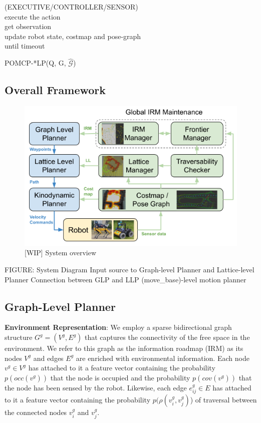 \documentclass{article}
\newcommand{\ph}[1]{{\textbf{#1}:}} %
\begin{document}
    (EXECUTIVE/CONTROLLER/SENSOR)\\
    execute the action\\
    get observation\\
    update robot state, costmap and pose-graph\\
until timeout


POMCP-*LP(Q, G, $\hat{\mathcal{G}}$)
\fi %







\subsection{Overall Framework} 



\begin{figure}[t!]
  \centering
  \includegraphics[width=.6\textwidth]{figures/SystemOverview.png}
  \caption{[WIP] System overview}
  \label{fig:system_overview}
\end{figure}

FIGURE: System Diagram
Input source to Graph-level Planner and Lattice-level Planner 
Connection between GLP and LLP
(move\_base)-level motion planner





\subsection{Graph-Level Planner} 


\ph{Environment Representation} We employ a sparse bidirectional graph structure $G^g = (V^g, E^g)$ that captures the connectivity of the free space in the environment. We refer to this graph as the information roadmap (IRM) as its nodes $V^g$ and edges $E^g$ are enriched with environmental information. Each node $v^g \in V^g$ has attached to it a feature vector containing the probability $p(occ(v^g))$ that the node is occupied and the probability $p(cov(v^g))$ that the node has been sensed by the robot. Likewise, each edge $e_{ij}^g \in E$ has attached to it a feature vector containing the probability $p(\rho(v_i^g, v_j^g)$) of traversal between the connected nodes $v_i^g$ and $v_j^g$.
\end{document}

